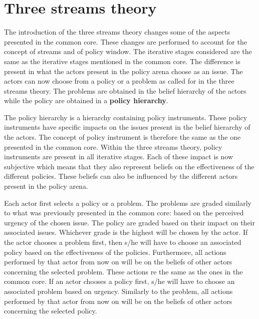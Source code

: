 \section{Three streams theory}
\label{sec:conceptualisation3SRevised}

The introduction of the three streams theory changes some of the aspects presented in the common core. These changes are performed to account for the concept of streams and of policy window. The iterative stages considered are the same as the iterative stages mentioned in the common core. The difference is present in what the actors present in the policy arena choose as an issue. The actors can now choose from a policy or a problem as called for in the three streams theory. The problems are obtained in the belief hierarchy of the actors while the policy are obtained in a {\bfseries policy hierarchy}. 

The policy hierarchy is a hierarchy containing policy instruments. These policy instruments have specific impacts on the issues present in the belief hierarchy of the actors. The concept of policy instrument is therefore the same as the one presented in the common core. Within the three streams theory, policy instruments are present in all iterative stages. Each of these impact is now subjective which means that they also represent beliefs on the effectiveness of the different policies. These beliefs can also be influenced by the different actors present in the policy arena.

Each actor first selects a policy or a problem. The problems are graded similarly to what was previously presented in the common core: based on the perceived urgency of the chosen issue. The policy are graded based on their impact on their associated issues. Whichever grade is the highest will be chosen by the actor. If the actor chooses a problem first, then s/he will have to choose an associated policy based on the effectiveness of the policies. Furthermore, all actions performed by that actor from now on will be on the beliefs of other actors concerning the selected problem. These actions re the same as the ones in the common core. If an actor chooses a policy first, s/he will have to choose an associated problem based on urgency. Similarly to the problem, all actions performed by that actor from now on will be on the beliefs of other actors concerning the selected policy.

